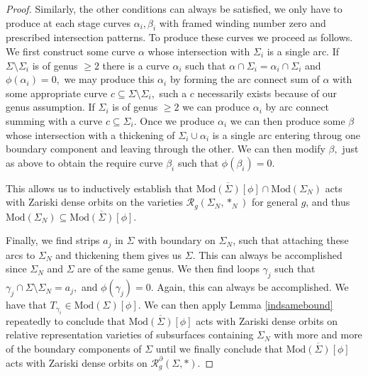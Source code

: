 \documentclass{article}
\newcommand{\Rc}{\mathcal{R}}
\newcommand{\Mod}{\textrm{Mod}}
\begin{document}
\begin{proof}
 Similarly, the other conditions can always be satisfied, we only have to produce at each stage curves $\alpha_i, \beta_i$ with framed winding number zero and prescribed intersection patterns. To produce these curves we proceed as follows. We first construct some curve $\alpha$ whose intersection with $\Sigma_i$ is a single arc. If $\Sigma \setminus \Sigma_i$ is of genus $\ge 2$ there is a curve $\alpha_i$ such that $\alpha \cap \Sigma_i  =\alpha_i \cap \Sigma_i$ and $\phi (\alpha_i) =0,$ we may produce this $\alpha_i$ by forming the arc connect sum of $\alpha$ with some appropriate curve $c \subseteq \Sigma \setminus \Sigma_i,$ such a $c$ necessarily exists because of our genus assumption. If $\Sigma_i$ is of genus $\ge 2$ we can produce $\alpha_i$ by arc connect summing with a curve $c \subseteq \Sigma_i.$ Once we produce $\alpha_i$ we can then produce  some $\beta$ whose intersection with a thickening of $\Sigma_i \cup \alpha_i$ is a single arc entering throug one boundary component and leaving through the other. We can then modify $\beta,$ just as above to obtain the require curve $\beta_i$ such that $\phi(\beta_i)=0.$
 
 
 
 This allows us to inductively establish that $\overline{\Mod(\Sigma)[\phi]} \cap \Mod(\Sigma_N)$ acts with Zariski dense orbits on the varieties $\Rc_g(\Sigma_N, *_N)$ for general $g$, and thus $\Mod(\Sigma_N) \subseteq \overline{\Mod(\Sigma)[\phi]}.$

 Finally, we find strips $a_j$ in $\Sigma$ with boundary on $\Sigma_N$, such that attaching these arcs to $\Sigma_N$ and thickening them gives us $\Sigma$. This can always be accomplished since $\Sigma_N$ and $\Sigma$ are of the same genus. We then find loops $\gamma_j$ such that $\gamma_j \cap \Sigma \setminus \Sigma_N  = a_j,$ and $\phi(\gamma_j ) =0.$ Again, this can always be accomplished. We have that $T_{\gamma_i} \in \Mod(\Sigma)[\phi].$ We can then apply Lemma \ref{indsamebound} repeatedly to conclude that $\overline{\Mod(\Sigma)[\phi]}$ acts with Zariski dense  orbits on relative representation varieties of subsurfaces containing $\Sigma_N$ with more and more  of the boundary components  of $\Sigma$ until we finally conclude that $\overline{\Mod(\Sigma) [\phi]}$ acts with Zariski dense orbits on $\Rc^{\partial}_g(\Sigma, *).$
 

 
\end{proof}
\end{document}
